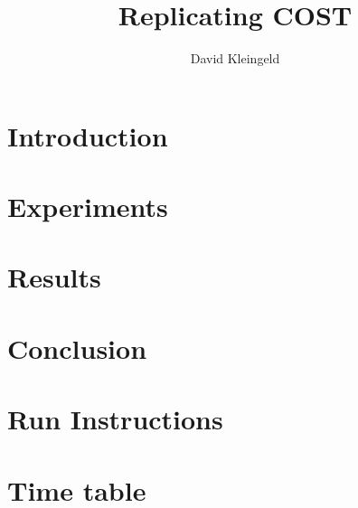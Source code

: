 \documentclass[lang=en, hanging-titles=true]{skrapport}
\title{Replicating COST}
\author[dskleingeld@gmail.com]{David Kleingeld}
\begin{document}
\maketitle
\tableofcontents

\newpage
\section{Introduction} \label{into}

\section{Experiments} \label{exp}

\section{Results} \label{res}

\clearpage
\section{Conclusion} \label{concl}


\clearpage
\appendix
\section{Run Instructions}
\section{Time table}
%
\printbibliography
\end{document}
